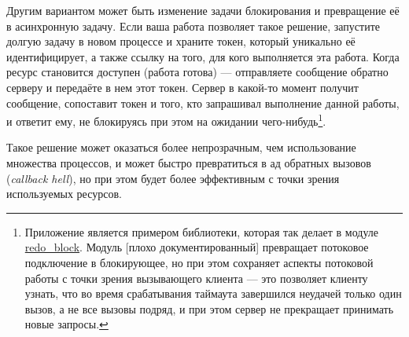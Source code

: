 \documentclass[11pt, oneside]{book}   	%
\begin{document}
Другим вариантом может быть изменение задачи блокирования и превращение её в асинхронную задачу. Если ваша работа позволяет такое решение, запустите долгую задачу в новом процессе и храните токен, который уникально её идентифицирует, а также ссылку на того, для кого выполняется эта работа. Когда ресурс становится доступен (работа готова) --- отправляете сообщение обратно серверу и передаёте в нем этот токен. Сервер в какой-то момент получит сообщение, сопоставит токен и того, кто запрашивал выполнение данной работы, и ответит ему, не блокируясь при этом на ожидании чего-нибудь\footnote{Приложение  является примером библиотеки, которая так делает в модуле \href{https://github.com/heroku/redo/blob/master/src/redo\_block.erl}{redo\_block}. Модуль [плохо документированный] превращает потоковое подключение в блокирующее, но при этом сохраняет аспекты потоковой работы с точки зрения вызывающего клиента --- это позволяет клиенту узнать, что во время срабатывания таймаута завершился неудачей только один вызов, а не все вызовы подряд, и при этом сервер не прекращает принимать новые запросы.}.

Такое решение может оказаться более непрозрачным, чем использование множества процессов, и может быстро превратиться в ад обратных вызовов (\emph{callback hell}), но при этом будет более эффективным с точки зрения используемых ресурсов.


\end{document}
